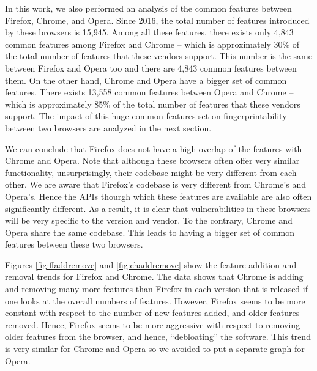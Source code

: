 
  In this work, we also performed an analysis of the common features
  between Firefox, Chrome, and Opera. Since 2016, the total number of features
  introduced by these browsers is 15,945. Among all these features,
  there exists only 4,843 common features among Firefox and Chrome -- which is
  approximately 30\% of the total number of features that these
  vendors support. This number is the same between Firefox and Opera too and
  there are 4,843 common features between them. On the other hand, Chrome and Opera
  have a bigger set of common features. There exists 13,558 
  common features between Opera and Chrome -- which is approximately 85\% of the total
  number of features that these vendors support. The impact of this huge common features set
  on fingerprintability between two browsers are analyzed in the next section.

  We can conclude that Firefox does not have a high overlap of the features with Chrome and Opera.
  Note that although these browsers often offer very similar functionality,
  unsurprisingly, their codebase might be very different from each other.
  We are aware that Firefox's codebase is very different from Chrome's and Opera's.
  Hence the APIs thourgh which these features are available are also often
  significantly different. As a result, it is clear that
  vulnerabilities in these browsers will be very specific to the
  version and vendor. To the contrary, Chrome and Opera share the same codebase.
  This leads to having a bigger set of common features between these two browsers.

  Figures \ref{fig:ffaddremove} and \ref{fig:chaddremove} show the
  feature addition and removal trends for Firefox and Chrome. The data
  shows that Chrome is adding and removing many more features than
  Firefox in each version that is released if one looks at the overall
  numbers of features. However, Firefox seems to be more constant with
  respect to the number of new features added, and older features
  removed. Hence, Firefox seems to be more aggressive with respect to
  removing older features from the browser, and hence, ``debloating''
  the software. This trend is very similar for Chrome and Opera so we avoided
  to put a separate graph for Opera.


